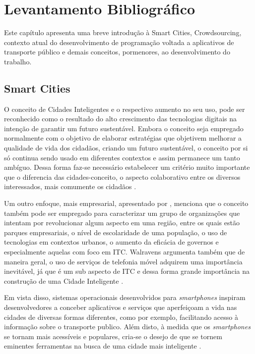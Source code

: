 \chapter{Levantamento Bibliográfico}\label{cap:levbibliog}

Este capítulo apresenta uma breve introdução à Smart Cities, Crowdsourcing, contexto atual do desenvolvimento de programação voltada a aplicativos de transporte público e demais conceitos, pormenores, ao desenvolvimento do trabalho.

\section{Smart Cities}

O conceito de Cidades Inteligentes e o respectivo aumento no seu uso, pode ser reconhecido como o resultado do alto crescimento das tecnologias digitais na intenção de garantir um futuro sustentável. Embora o conceito seja empregado normalmente com o objetivo de elaborar estratégias que objetivem melhorar a qualidade de vida dos cidadãos, criando um futuro sustentável, o conceito por si só continua sendo usado em diferentes contextos e assim permanece um tanto ambíguo. Dessa forma faz-se necessário estabelecer um critério muito importante que o diferencia das cidades-conceito, o aspecto colaborativo entre os diversos interessados, mais comumente os cidadãos \cite{schuurman}. 

Um outro enfoque, mais empresarial, apresentado por , menciona que o conceito também pode ser empregado para caracterizar um grupo de organizações que intentam por revolucionar algum aspecto em uma região, entre os quais estão parques empresariais, o nível de escolaridade de uma população, o uso de tecnologias em contextos urbanos, o aumento da eficácia de governos e especialmente aquelas com foco em ITC. Walravens argumenta também que de maneira geral, o uso de serviços de telefonia móvel adquirem uma importância inevitável, já que é um sub aspecto de ITC e dessa forma grande importância na construção de uma Cidade Inteligente \cite{walravens}.

Em vista disso, sistemas operacionais desenvolvidos para \emph{smartphones} inspiram desenvolvedores a conceber aplicativos e serviços que aperfeiçoam a vida nas cidades de diversas formas diferentes, como por exemplo, facilitando acesso à informação sobre o transporte publico. Além disto, à medida que os \emph{smartphones} se tornam mais acessíveis e populares, cria-se o desejo de que se tornem eminentes ferramentas na busca de uma cidade mais inteligente \cite{walravens}.


